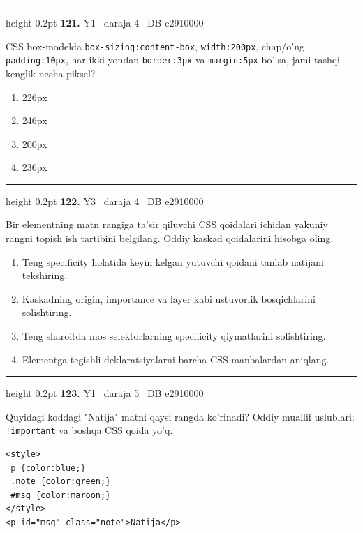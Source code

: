 \documentclass[10pt,a4paper,oneside]{article}
\begin{document}
\vspace{2mm}\hrule height 0.2pt \vspace{4mm}
\hypertarget{q121}{\textbf{\color{ink}121.}}  {\color{muted}\scriptsize Y1 \textbullet\ daraja 4 \textbullet\ DB e2910000}
\par
CSS box-modelda \texttt{box-sizing:content-box}, \texttt{width:200px}, chap/o'ng \texttt{padding:10px}, har ikki yondan \texttt{border:3px} va \texttt{margin:5px} bo'lsa, jami tashqi kenglik necha piksel?
\begin{enumerate}[label=\Alph*),leftmargin=9mm]
\item 226px
\item 246px
\item 200px
\item 236px
\end{enumerate}
\vspace{2mm}\hrule height 0.2pt \vspace{4mm}
\hypertarget{q122}{\textbf{\color{ink}122.}}  {\color{muted}\scriptsize Y3 \textbullet\ daraja 4 \textbullet\ DB e2910000}
\par
Bir elementning matn rangiga ta'sir qiluvchi CSS qoidalari ichidan yakuniy rangni topish ish tartibini belgilang. Oddiy kaskad qoidalarini hisobga oling.
\begin{enumerate}[label=\Alph*),leftmargin=9mm]
\item Teng specificity holatida keyin kelgan yutuvchi qoidani tanlab natijani tekshiring.
\item Kaskadning origin, importance va layer kabi ustuvorlik bosqichlarini solishtiring.
\item Teng sharoitda mos selektorlarning specificity qiymatlarini solishtiring.
\item Elementga tegishli deklaratsiyalarni barcha CSS manbalardan aniqlang.
\end{enumerate}
\vspace{2mm}\hrule height 0.2pt \vspace{4mm}
\hypertarget{q123}{\textbf{\color{ink}123.}}  {\color{muted}\scriptsize Y1 \textbullet\ daraja 5 \textbullet\ DB e2910000}
\par
Quyidagi koddagi "Natija" matni qaysi rangda ko'rinadi? Oddiy muallif uslublari; \texttt{!important} va boshqa CSS qoida yo'q.\par
\begin{lstlisting}
<style>
 p {color:blue;}
 .note {color:green;}
 #msg {color:maroon;}
</style>
<p id="msg" class="note">Natija</p>
\end{lstlisting}
\end{document}
